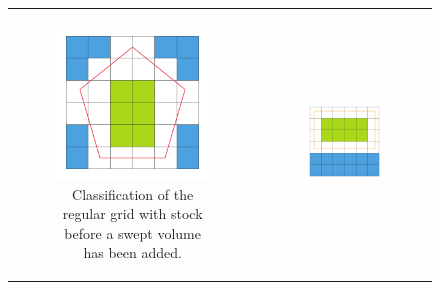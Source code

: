 \begin{figure}[!h]
	\centering
	\begin{tabular}{cc}
		\begin{subfigure}[t]{0.3\textwidth}
			\centering
			\includegraphics[width=\textwidth]{images/classification_before}
			\caption{Classification of the regular grid with stock before a swept volume has been added.}
			\label{fig:classification_before}
		\end{subfigure}&
		\begin{subfigure}[t]{0.3\textwidth}
			\centering
			\includegraphics[width=\textwidth]{images/classification_sv}

\end{subfigure}
\end{tabular}
\end{figure}
